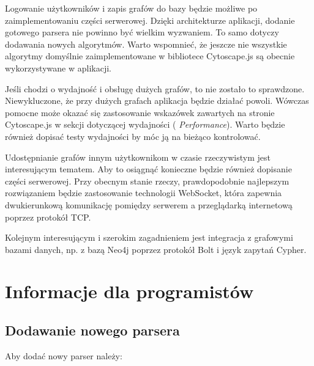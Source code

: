 Logowanie użytkowników i zapis grafów do bazy będzie możliwe po zaimplementowaniu części serwerowej. Dzięki architekturze aplikacji, dodanie gotowego parsera nie powinno być wielkim wyzwaniem. To samo dotyczy dodawania nowych algorytmów. Warto wspomnieć, że jeszcze nie wszystkie algorytmy domyślnie zaimplementowane w bibliotece Cytoscape.js są obecnie wykorzystywane w aplikacji.

Jeśli chodzi o wydajność i obsługę dużych grafów, to nie zostało to sprawdzone. Niewykluczone, że przy dużych grafach aplikacja będzie działać powoli. Wówczas pomocne może okazać się zastosowanie wskazówek zawartych na stronie Cytoscape.js w sekcji dotyczącej wydajności (\cite{cytoscape} \textit{Performance}). Warto będzie również dopisać testy wydajności by móc ją na bieżąco kontrolować. 

Udostępnianie grafów innym użytkownikom w czasie rzeczywistym jest interesującym tematem. Aby to osiągnąć konieczne będzie również dopisanie części serwerowej. Przy obecnym stanie rzeczy, prawdopodobnie najlepszym rozwiązaniem będzie zastosowanie technologii WebSocket, która zapewnia dwukierunkową komunikację pomiędzy serwerem a przeglądarką internetową poprzez protokół TCP. 

Kolejnym interesującym i szerokim zagadnieniem jest integracja z grafowymi bazami danych, np. z bazą Neo4j poprzez protokół Bolt i język zapytań Cypher.

\section{Informacje dla programistów}

\subsection*{Dodawanie nowego parsera}

Aby dodać nowy parser należy:

